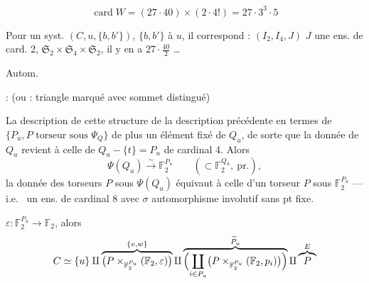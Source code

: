 \documentclass[11pt,a4paper]{article}
\begin{document}
\[
\operatorname{card} W = (27 \cdot 40) \times (2 \cdot 4!) = 27 \cdot 3^{3} \cdot 5
\]

Pour un syst. $(C, u, \lbrace b, b' \rbrace)$, $\lbrace b, b' \rbrace$ \ill{}
 à $u$, il correspond : $(I_2, I_4, J)$ $J$ une ens.
de card. 2, $\mathfrak{S}_2 \times \mathfrak{S}_4 \times \mathfrak{S}_2$, il
y en a $27 \cdot \frac{40}{2}$ \ldots

Autom.

 : \emph{} (ou :
triangle marqué avec sommet distingué)


La description de cette structure \ill{} \ill{} de la description
précédente en termes de $\lbrace P_u, P \text{ torseur sous } \Psi_Q \rbrace$
\ill{} \ill{} de plus un élément fixé  de $Q_u$, de sorte que
la donnée de $Q_u$  revient à celle de
$Q_u - \lbrace t \rbrace = P_u$ de cardinal 4. Alors
\[
\Psi(Q_u) \xrightarrow{\ \sim\ } \mathbb{F}_2^{P_u}
\qquad (\subset \mathbb{F}_2^{Q_u},\ \text{pr.}),
\]
 la donnée des torseurs $P$ sous $\Psi(Q_u)$ équivaut à celle d'un
torseur $P$ sous $\mathbb{F}_2^{P_u}$ — i.e.\ 
un ens.  de cardinal 8 avec $\sigma$ automorphisme
involutif sans pt fixe.

 \struck{\ill{}} 
$\varepsilon : \mathbb{F}_2^{P_u} \to \mathbb{F}_2$, alors
\[
C \simeq \lbrace u \rbrace \amalg
\overbrace{\bigl(P \times_{\mathbb{F}_2^{P_u}} (\mathbb{F}_2, \varepsilon)\bigr)}^{\lbrace v, w \rbrace}
\amalg
\overbrace{\Bigl(\coprod_{i \in P_u} \bigl(P \times_{\mathbb{F}_2^{P_u}} (\mathbb{F}_2, p_i)\bigr)\Bigr)}^{\widetilde{P}_u}
\amalg \overbrace{P}^{E}
\]

\end{document}
